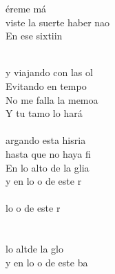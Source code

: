 \begin{cancion}[Sixtinain][Guitarricadelafuente]
	éreme má\\
	viste la suerte haber nao\\
	En ese sixtiin \\\jump\\
	\begin{chorus}%
	y viajando con las ol\\
	Evitando en tempo\\
	No me falla la memoa\\
	Y tu tamo lo hará\\
\jump\\
	argando esta hisria \\
	hasta que no haya fi\\
	En lo alto de la glia \\
	y en lo o de este r  \\
\jump\\
	lo o de este r\\
\jump\\
	   \\
	 lo altde la glo \\
	y en lo o de este ba\\
	\end{chorus}%
	\jump\\
\end{cancion}%
